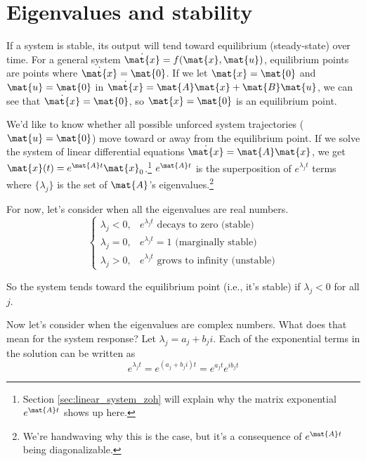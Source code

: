 \section{Eigenvalues and stability}

If a system is stable, its output will tend toward equilibrium (steady-state)
over time. For a general system $\dot{\mat{x}} = f(\mat{x}, \mat{u})$,
equilibrium points are points where $\dot{\mat{x}} = \mat{0}$. If we let
$\mat{x} = \mat{0}$ and $\mat{u} = \mat{0}$ in
$\dot{\mat{x}} = \mat{A}\mat{x} + \mat{B}\mat{u}$, we can see that
$\dot{\mat{x}} = \mat{0}$, so $\mat{x} = \mat{0}$ is an equilibrium point.

We'd like to know whether all possible unforced system trajectories
($\mat{u} = \mat{0}$) move toward or away from the equilibrium point. If we
solve the system of linear differential equations
$\dot{\mat{x}} = \mat{A}\mat{x}$, we get
$\mat{x}(t) = e^{\mat{A}t} \mat{x}_0$.\footnote{Section
\ref{sec:linear_system_zoh} will explain why the matrix exponential
$e^{\mat{A}t}$ shows up here.} $e^{\mat{A}t}$ is the superposition of
$e^{\lambda_j t}$ terms where $\{\lambda_j\}$ is the set of $\mat{A}$'s
eigenvalues.\footnote{We're handwaving why this is the case, but it's a
consequence of $e^{\mat{A}t}$ being diagonalizable.}

For now, let's consider when all the eigenvalues are real numbers.
\begin{equation*}
  \begin{cases}
    \lambda_j < 0, & e^{\lambda_j t} \text{ decays to zero (stable)}
      \\
    \lambda_j = 0, & e^{\lambda_j t} = 1 \text{ (marginally stable)} \\
    \lambda_j > 0, & e^{\lambda_j t} \text{ grows to infinity (unstable)}
  \end{cases}
\end{equation*}

So the system tends toward the equilibrium point (i.e., it's stable) if
$\lambda_j < 0$ for all $j$.

Now let's consider when the eigenvalues are complex numbers. What does that mean
for the system response? Let $\lambda_j = a_j + b_j i$. Each of the exponential
terms in the solution can be written as
\begin{equation*}
  e^{\lambda_j t} = e^{(a_j + b_j i)t} = e^{a_j t} e^{i b_j t}
\end{equation*}

